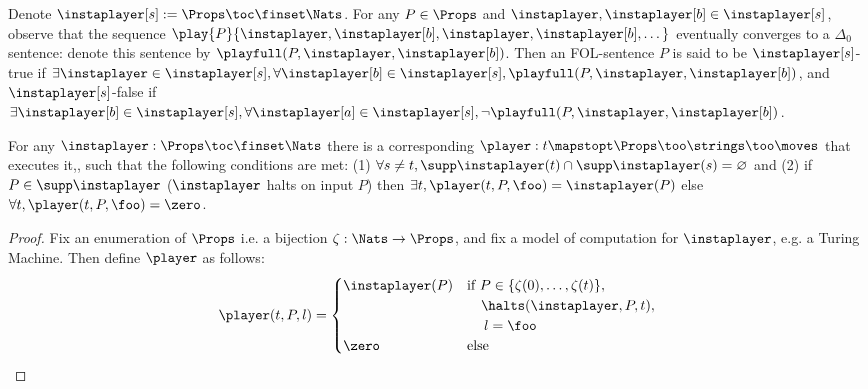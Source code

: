 \begin{definition}
    Denote $\instaplayer[s]:=\Props\toc\finset\Nats$. For any $P\in\Props$ and $\instaplayer,\instaplayer[b]\in\instaplayer[s]$, observe that the sequence $\play{P}{\instaplayer,\instaplayer[b],\instaplayer,\instaplayer[b],\dots}$ eventually converges to a $\Delta_0$ sentence: denote this sentence by $\playfull(P,\instaplayer,\instaplayer[b])$. Then an FOL-sentence $P$ is said to be $\instaplayer[s]$-true if $\exists\instaplayer\in\instaplayer[s],\forall\instaplayer[b]\in\instaplayer[s],\playfull(P,\instaplayer,\instaplayer[b])$, and $\instaplayer[s]$-false if $\exists\instaplayer[b]\in\instaplayer[s],\forall\instaplayer[a]\in\instaplayer[s],\lnot\playfull(P,\instaplayer,\instaplayer[b])$.
    \label{nonvf:def:constructive}
\end{definition}

\begin{lemma}
    For any $\instaplayer:\Props\toc\finset\Nats$ there is a corresponding $\player:t\mapstopt\Props\too\strings\too\moves$ that executes it,, such that the following conditions are met: (1) $\forall s\ne t,\supp\instaplayer(t)\cap\supp\instaplayer(s)=\varnothing$ and (2) if $P\in\supp\instaplayer$ ($\instaplayer$ halts on input $P$) then $\exists t,\player(t,P,\foo)=\instaplayer(P)$ else $\forall t,\player(t,P,\foo)=\zero$.
    \label{nonvf:lem:correspondence}
\end{lemma}
\begin{proof}
    Fix an enumeration of $\Props$ i.e. a bijection $\zeta:\Nats\to\Props$, and fix a model of computation for $\instaplayer$, e.g. a Turing Machine. Then define $\player$ as follows:
    \begin{equation*}
        \player(t,P,l)=
        \begin{cases}
            \instaplayer(P) & \text{if } P\in\{\zeta(0),\dots,\zeta(t)\},\\&\ \ \ %
            \halts(\instaplayer,P,t),\\&\ \ \ \:%
            l=\foo \\
            \zero & \text{else}
        \end{cases}
    \end{equation*}
\end{proof}

